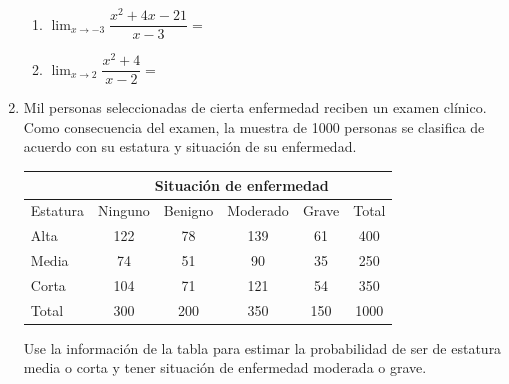 \documentclass[letterpaper,fleqn]{article}
\let\ds\displaystyle
\begin{document}
\begin{enumerate}
\begin{enumerate}
\item $\ds{\lim_{x\rightarrow -3}\dfrac{x^{2}+4x-21}{x-3}}=$\noanswer
\item $\ds{\lim_{x\rightarrow 2}\dfrac{x^{2}+4}{x-2}}=$\noanswer
\end{enumerate} 
\item Mil personas seleccionadas de cierta enfermedad reciben un examen clínico. Como consecuencia del examen, la muestra de 1000 personas se clasifica de acuerdo con su estatura y situaci\'{o}n de su enfermedad.
\begin{center}
\begin{tabular}{lccccc}
 & \multicolumn{5}{c}{Situación de enfermedad} \\ \hline 
Estatura & Ninguno & Benigno & Moderado & Grave & Total \\ \hline
Alta & 122 & 78 & 139 & 61 & 400 \\ 
Media & 74 & 51 & 90 & 35 & 250 \\ 
Corta & 104 & 71 & 121 & 54 & 350 \\ 
\hline 
Total & 300 & 200 & 350 & 150 & 1000 \\ 
\hline 
\end{tabular} 
\end{center}
Use la información de la tabla para estimar la probabilidad de ser de estatura media o corta y tener situación de enfermedad moderada o grave.\noanswer
 \end{enumerate}
\end{document}

